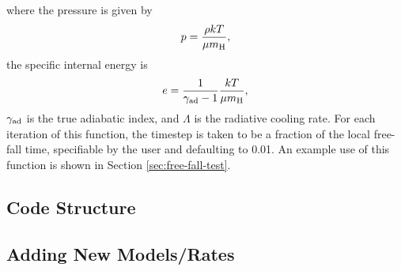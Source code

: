 where the pressure is given by
\begin{equation}
p = \frac{\rho k T}{\mu m_{\rm H}},
\end{equation}
the specific internal energy is
\begin{equation}
e = \frac{1}{\gamma_{\rm ad} -1} \frac{k T}{\mu m_{\rm H}},
\label{eq:defen}
\end{equation}
$\gamma_{\rm ad}$ is the true adiabatic index, and $\Lambda$ is the
radiative cooling rate.  For each iteration of this function, the
timestep is taken to be a fraction of the local free-fall time,
specifiable by the user and defaulting to 0.01.  An example use of
this function is shown in Section \ref{sec:free-fall-test}.

\subsection{Code Structure} \label{Code_Structure}

\subsection{Adding New Models/Rates}

